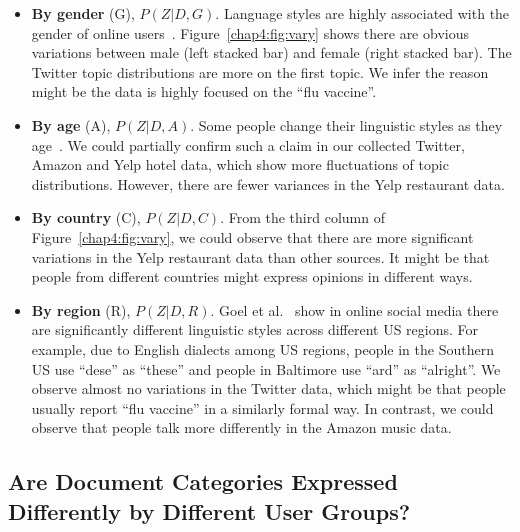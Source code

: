 \begin{itemize}
    \item \textbf{By gender} (G), $P(Z|D, G)$. Language styles are highly associated with the gender of online users~\cite{hovy2018capturing}. Figure~\ref{chap4:fig:vary} shows there are obvious variations between male (left stacked bar) and female (right stacked bar). The Twitter topic distributions are more on the first topic. We infer the reason might be the data is highly focused on the ``flu vaccine''.
    \item \textbf{By age} (A), $P(Z|D, A)$. Some people change their linguistic styles as they age~\cite{wagner2012age}. We could partially confirm such a claim in our collected Twitter, Amazon and Yelp hotel data, which show more fluctuations of topic distributions. However, there are fewer variances in the Yelp restaurant data. 
    \item \textbf{By country} (C), $P(Z|D, C)$. From the third column of Figure~\ref{chap4:fig:vary}, we could observe that there are more significant variations in the Yelp restaurant data than other sources. It might be that people from different countries might express opinions in different ways. 
    \item \textbf{By region} (R), $P(Z|D, R)$. Goel et al.~\cite{goel2016social} show in online social media there are significantly different linguistic styles across different US regions. For example, due to English dialects among US regions, people in the Southern US use ``dese'' as ``these'' and people in Baltimore use ``ard'' as ``alright''. We observe almost no variations in the Twitter data, which might be that people usually report ``flu vaccine'' in a similarly formal way. In contrast, we could observe that people talk more differently in the Amazon music data. 
\end{itemize}


\subsection{Are Document Categories Expressed Differently by Different User Groups?}


